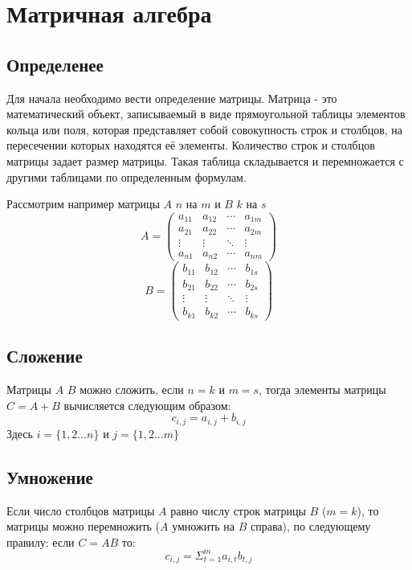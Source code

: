 \documentclass[a4paper,12pt]{article}
\begin{document}
	\section{Матричная алгебра}
	\subsection{Определенее}
	Для начала необходимо вести определение матрицы. Матрица - это математический объект, записываемый в виде прямоугольной таблицы элементов кольца или поля, которая представляет собой совокупность строк и столбцов, на пересечении которых находятся её элементы. Количество строк и столбцов матрицы задает размер матрицы. Такая таблица складывается и перемножается с другими таблицами по определенным формулам.\par
	Рассмотрим например матрицы $A$ $n$ на $m$ и $B$ $k$ на $s$
\begin{equation}
A = \begin{pmatrix}
a_{11} & a_{12} & \cdots & a_{1m} \\
a_{21} & a_{22} & \cdots & a_{2m} \\         
\vdots & \vdots & \ddots & \vdots \\
a_{n1} & a_{n2} & \cdots & a_{nm}
\end{pmatrix}
\end{equation}
\begin{equation}
B = \begin{pmatrix}
b_{11} & b_{12} & \cdots & b_{1s} \\
b_{21} & b_{22} & \cdots & b_{2s} \\         
\vdots & \vdots & \ddots & \vdots \\
b_{k1} & b_{k2} & \cdots & b_{ks}
\end{pmatrix}
\end{equation}
\subsection{Сложение}
Матрицы $A$ $B$ можно сложить, если $n=k$ и $m=s$, тогда элементы матрицы $C=A+B$ вычисляется следующим образом:
\begin{equation}
c_{i,j}=a_{i,j}+b_{i,j}
\end{equation}
Здесь $i = \{1,2\ldots n\}$ и $j = \{1,2\ldots m\}$
\subsection{Умножение}
Если число столбцов матрицы $A$ равно числу строк матрицы $B$ ($m=k$), то матрицы можно перемножить ($A$ умножить на $B$ справа), по следующему правилу: если $C=AB$ то:
\begin{equation}
c_{i,j}=\Sigma_{t=1}^{m}a_{i,t}b_{t,j}
\end{equation}
\end{document}
